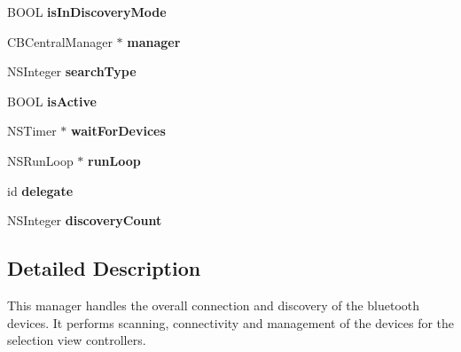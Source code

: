 \begin{DoxyCompactItemize}
\item 
\hypertarget{interface_b_t_device_manager_a15cc71749368c5de76624c5c4e4f7b3c}{B\-O\-O\-L {\bfseries is\-In\-Discovery\-Mode}}\label{interface_b_t_device_manager_a15cc71749368c5de76624c5c4e4f7b3c}

\item 
\hypertarget{interface_b_t_device_manager_a61d03c41c000f28ce50e88bd9b8f6be9}{C\-B\-Central\-Manager $\ast$ {\bfseries manager}}\label{interface_b_t_device_manager_a61d03c41c000f28ce50e88bd9b8f6be9}

\item 
\hypertarget{interface_b_t_device_manager_a610db66209e9d142e5451ceedc3c6a36}{N\-S\-Integer {\bfseries search\-Type}}\label{interface_b_t_device_manager_a610db66209e9d142e5451ceedc3c6a36}

\item 
\hypertarget{interface_b_t_device_manager_a0864f241d9fc14f03e5f8e2b4dd0667a}{B\-O\-O\-L {\bfseries is\-Active}}\label{interface_b_t_device_manager_a0864f241d9fc14f03e5f8e2b4dd0667a}

\item 
\hypertarget{interface_b_t_device_manager_aad4f780b6477ad7d37f6e85f3f40f1c0}{N\-S\-Timer $\ast$ {\bfseries wait\-For\-Devices}}\label{interface_b_t_device_manager_aad4f780b6477ad7d37f6e85f3f40f1c0}

\item 
\hypertarget{interface_b_t_device_manager_a2f3ce5cb472e8f042d4b427518d0ffea}{N\-S\-Run\-Loop $\ast$ {\bfseries run\-Loop}}\label{interface_b_t_device_manager_a2f3ce5cb472e8f042d4b427518d0ffea}

\item 
\hypertarget{interface_b_t_device_manager_a53dc4023fb9a5873cd8f7a82489d25c0}{id {\bfseries delegate}}\label{interface_b_t_device_manager_a53dc4023fb9a5873cd8f7a82489d25c0}

\item 
\hypertarget{interface_b_t_device_manager_ac70dac2c693cf191a05a606d7cea9763}{N\-S\-Integer {\bfseries discovery\-Count}}\label{interface_b_t_device_manager_ac70dac2c693cf191a05a606d7cea9763}

\end{DoxyCompactItemize}


\subsection{Detailed Description}
This manager handles the overall connection and discovery of the bluetooth devices. It performs scanning, connectivity and management of the devices for the selection view controllers. 

